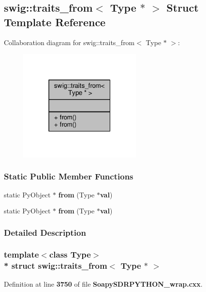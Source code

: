\subsection{swig\+:\+:traits\+\_\+from$<$ Type $\ast$ $>$ Struct Template Reference}
\label{structswig_1_1traits__from_3_01Type_01_5_01_4}


Collaboration diagram for swig\+:\+:traits\+\_\+from$<$ Type $\ast$ $>$\+:
\nopagebreak
\begin{figure}[H]
\begin{center}
\leavevmode
\includegraphics[width=175pt]{d8/d98/structswig_1_1traits__from_3_01Type_01_5_01_4__coll__graph}
\end{center}
\end{figure}
\subsubsection*{Static Public Member Functions}
\begin{DoxyCompactItemize}
\item 
static Py\+Object $\ast$ {\bf from} (Type $\ast${\bf val})
\item 
static Py\+Object $\ast$ {\bf from} (Type $\ast${\bf val})
\end{DoxyCompactItemize}


\subsubsection{Detailed Description}
\subsubsection*{template$<$class Type$>$\\*
struct swig\+::traits\+\_\+from$<$ Type $\ast$ $>$}



Definition at line {\bf 3750} of file {\bf Soapy\+S\+D\+R\+P\+Y\+T\+H\+O\+N\+\_\+wrap.\+cxx}.



